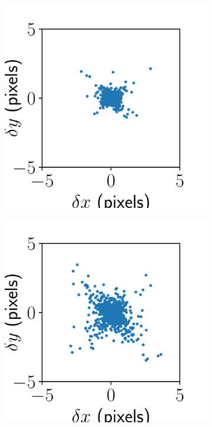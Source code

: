 \documentclass{article}
\begin{document}
\begin{figure}[ht]
\begin{subfigure}{0.24\linewidth}
		\caption{}
		\label{fig:alignmentresultbig1}
	\end{subfigure}
	\begin{subfigure}{0.24\linewidth}
		\includegraphics[width=\linewidth]{stitch-result-vectra-big-4.pdf}
		\caption{}
		\label{fig:stitchresultbig4}
	\end{subfigure}
	\begin{subfigure}{0.24\linewidth}
		\includegraphics[width=\linewidth]{stitch-result-vectra-big-3.pdf}

\end{subfigure}
\end{figure}
\end{document}
